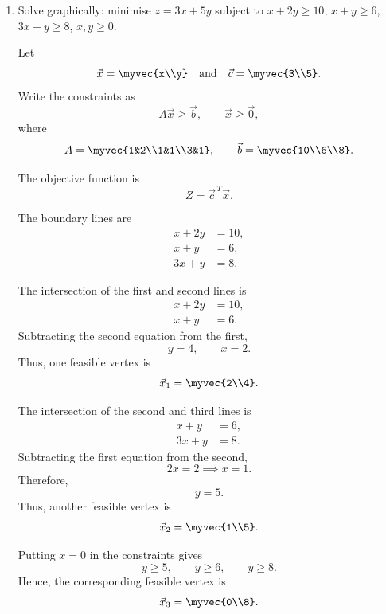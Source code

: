 \begin{enumerate}[label=\thesubsection.\arabic*, ref=\thesubsection.\theenumi]
    \par
    \medskip
    \par
    \smallskip

    \item
    \label{question:C12-Q59}
    \label{question-short:C12-Q59} Solve graphically: minimise $z=3x+5y$ subject to $x+2y\ge10$, $x+y\ge6$, $3x+y\ge8$, $x,y\ge0$.

    \par
    \smallskip
    \solution



Let
\[
\vec{x}=\myvec{x\\y}
\quad\text{and}\quad
\vec{c}=\myvec{3\\5}.
\]
Write the constraints as
\[
A\vec{x}\geq\vec{b},
\qquad
\vec{x}\geq\vec{0},
\]
where
\[
A=\myvec{1&2\\1&1\\3&1},
\qquad
\vec{b}=\myvec{10\\6\\8}.
\]

The objective function is
\[
Z=\vec{c}^{\,T}\vec{x}.
\]

\par
\medskip
\noindent
\par
\smallskip

The boundary lines are
\[
\begin{aligned}
x+2y&=10,\\
x+y&=6,\\
3x+y&=8.
\end{aligned}
\]

The intersection of the first and second lines is
\[
\begin{aligned}
x+2y&=10,\\
x+y&=6.
\end{aligned}
\]
Subtracting the second equation from the first,
\[
y=4,\qquad x=2.
\]
Thus, one feasible vertex is
\[
\vec{x}_1=\myvec{2\\4}.
\]

The intersection of the second and third lines is
\[
\begin{aligned}
x+y&=6,\\
3x+y&=8.
\end{aligned}
\]
Subtracting the first equation from the second,
\[
2x=2\implies x=1.
\]
Therefore,
\[
y=5.
\]
Thus, another feasible vertex is
\[
\vec{x}_2=\myvec{1\\5}.
\]

Putting $x=0$ in the constraints gives
\[
y\geq 5,\qquad y\geq 6,\qquad y\geq 8.
\]
Hence, the corresponding feasible vertex is
\[
\vec{x}_3=\myvec{0\\8}.
\]


\end{enumerate}
